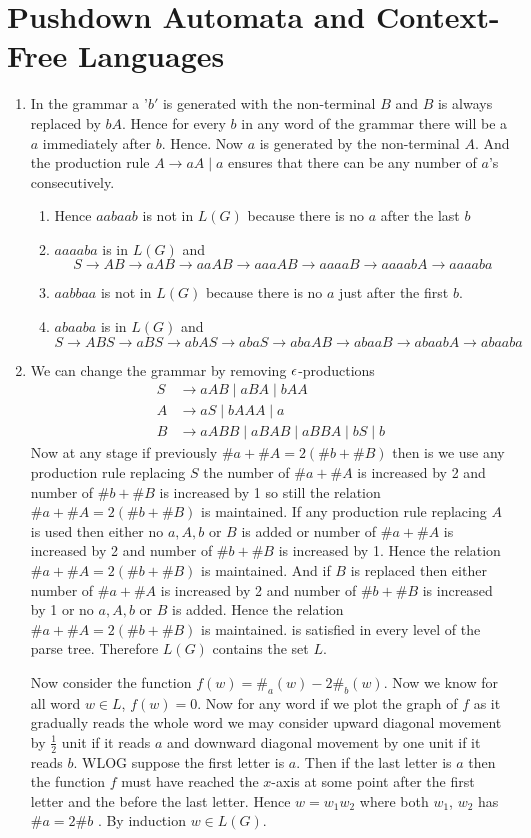 \chapter{Pushdown Automata and Context-Free Languages}
\begin{enumerate}
	\addtocounter{enumi}{68}
	\item In the grammar a '$b'$ is generated with the non-terminal $B$ and $B$ is always replaced by $bA$. Hence for every $b$ in any word of the grammar there will be a $a$ immediately after $b$. Hence. 
	Now $a$ is generated by the non-terminal $A$. And the production rule $A\to aA\mid a$ ensures that  there can be any number of $a$'s consecutively.\begin{enumerate}
		\item Hence $aabaab$ is not in $L(G)$ because there is no $a$ after the last $b$
		\item $aaaaba$ is in $L(G)$ and $$S\to AB\to aAB\to aaAB\to aaaAB\to aaaaB\to aaaabA\to aaaaba$$
		\item $aabbaa$ is not in $L(G)$ because there is no $a$ just after the first $b$.
		\item $abaaba$ is in $L(G)$ and $$S\to ABS\to aBS\to abAS\to abaS\to abaAB\to abaaB\to abaabA\to abaaba$$ 
	\end{enumerate}
\item We can change the grammar by removing $\epsilon$-productions
\begin{align*}
	S & \to   aAB \mid aBA \mid bAA \\
	A & \to aS \mid bAAA\mid a\\
	B & \to aABB \mid  aBAB \mid aBBA \mid bS \mid b
	\end{align*}
Now at any stage if previously $\# a+\# A=2(\# b+\# B)$ then is we use any production rule replacing $S$ the number of $\# a+\#A$ is increased by 2 and number of $\#b+\#B$ is increased by 1 so still the relation $\# a+\# A=2(\# b+\# B)$ is maintained. If any production rule replacing $A$ is used then either no $a,A,b$ or $B$ is added or number of $\# a+\#A$ is increased by 2 and number of $\#b+\#B$ is increased by 1. Hence the relation $\# a+\# A=2(\# b+\# B)$ is maintained. And if $B$ is replaced then either number of $\# a+\#A$ is increased by 2 and number of $\#b+\#B$ is increased by 1 or no $a,A,b$ or $B$ is added. Hence the relation $\# a+\# A=2(\# b+\# B)$ is maintained. is satisfied in every level of the parse tree. Therefore $L(G)$ contains the set $L$.
\parinn

Now consider the function $f(w)=\#_a(w)-2\#_b(w)$. Now we know for all word $w\in L$, $f(w)=0$. Now for any word if we plot the graph of $f$ as it gradually reads the whole word we may consider upward diagonal movement by $\frac12$ unit if it reads $a$ and downward diagonal movement by one unit if it reads $b$. WLOG suppose the first letter is $a$. Then if the last letter is $a$ then the function $f$ must have reached the $x$-axis at some point after the first letter and the before the last letter. Hence $w=w_1w_2$ where both $w_1$, $w_2$ has $\#a=2\# b$ . By induction $w\in L(G)$.


\end{enumerate}
